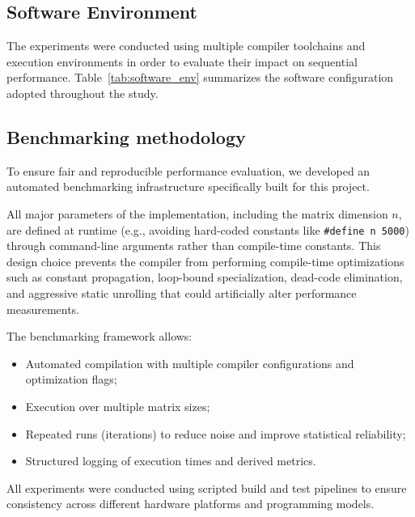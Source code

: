 \subsection{Software Environment}

The experiments were conducted using multiple compiler toolchains and execution environments in order to evaluate their impact on sequential performance.
Table~\ref{tab:software_env} summarizes the software configuration adopted throughout the study.








\subsection{Benchmarking methodology}

To ensure fair and reproducible performance evaluation, we developed an automated benchmarking infrastructure specifically built for this project.

All major parameters of the implementation, including the matrix dimension $n$, are defined at runtime (e.g., avoiding hard-coded constants like \texttt{\#define n 5000}) through command-line arguments rather than compile-time constants. 
This design choice prevents the compiler from performing compile-time optimizations such as constant propagation, loop-bound specialization, dead-code elimination, and aggressive static unrolling that could artificially alter performance measurements.

The benchmarking framework allows:
\begin{itemize}
    \item Automated compilation with multiple compiler configurations and optimization flags;
    \item Execution over multiple matrix sizes;
    \item Repeated runs (iterations) to reduce noise and improve statistical reliability;
    \item Structured logging of execution times and derived metrics.
\end{itemize}

All experiments were conducted using scripted build and test pipelines to ensure consistency across different hardware platforms and programming models.


